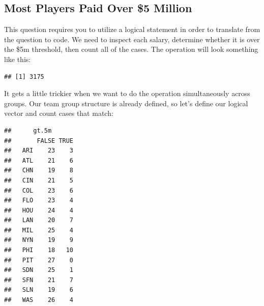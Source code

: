 \documentclass[]{book}
\newenvironment{Shaded}{\begin{snugshade}}{\end{snugshade}}
\newcommand{\DecValTok}[1]{\textcolor[rgb]{0.00,0.00,0.81}{#1}}
\newcommand{\FloatTok}[1]{\textcolor[rgb]{0.00,0.00,0.81}{#1}}
\newcommand{\KeywordTok}[1]{\textcolor[rgb]{0.13,0.29,0.53}{\textbf{#1}}}
\newcommand{\NormalTok}[1]{#1}
\newcommand{\OperatorTok}[1]{\textcolor[rgb]{0.81,0.36,0.00}{\textbf{#1}}}
\newcommand{\StringTok}[1]{\textcolor[rgb]{0.31,0.60,0.02}{#1}}
\theoremstyle{definition}
\theoremstyle{definition}
\theoremstyle{definition}
\theoremstyle{remark}
\begin{document}
\hypertarget{most-players-paid-over-5-million}{%
\subsection{Most Players Paid Over \$5
Million}\label{most-players-paid-over-5-million}}

This question requires you to utilize a logical statement in order to
translate from the question to code. We need to inspect each salary,
determine whether it is over the \$5m threshold, then count all of the
cases. The operation will look something like this:

\begin{Shaded}
\end{Shaded}

\begin{verbatim}
## [1] 3175
\end{verbatim}

It gets a little trickier when we want to do the operation
simultaneously across groups. Our team group structure is already
defined, so let's define our logical vector and count cases that match:

\begin{Shaded}
\end{Shaded}

\begin{verbatim}
##      gt.5m
##       FALSE TRUE
##   ARI    23    3
##   ATL    21    6
##   CHN    19    8
##   CIN    21    5
##   COL    23    6
##   FLO    23    4
##   HOU    24    4
##   LAN    20    7
##   MIL    25    4
##   NYN    19    9
##   PHI    18   10
##   PIT    27    0
##   SDN    25    1
##   SFN    21    7
##   SLN    19    6
##   WAS    26    4
\end{verbatim}
\end{document}
